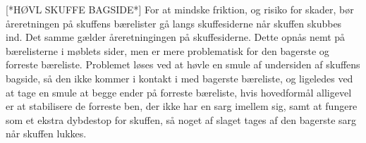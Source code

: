 [*HØVL SKUFFE BAGSIDE*]
For at mindske friktion, og risiko for skader, bør åreretningen på skuffens
bærelister gå langs skuffesiderne når skuffen skubbes ind. Det samme gælder
åreretningingen på skuffesiderne. Dette opnås nemt på bærelisterne i møblets
sider, men er mere problematisk for den bagerste og forreste bæreliste.
Problemet løses ved at høvle en smule af undersiden af skuffens bagside, så den
ikke kommer i kontakt i med bagerste bæreliste, og ligeledes ved at tage en
smule at begge ender på forreste bæreliste, hvis hovedformål alligevel er at
stabilisere de forreste ben, der ikke har en sarg imellem sig, samt at fungere
som et ekstra dybdestop for skuffen, så noget af slaget tages af den
bagerste sarg når skuffen lukkes.
